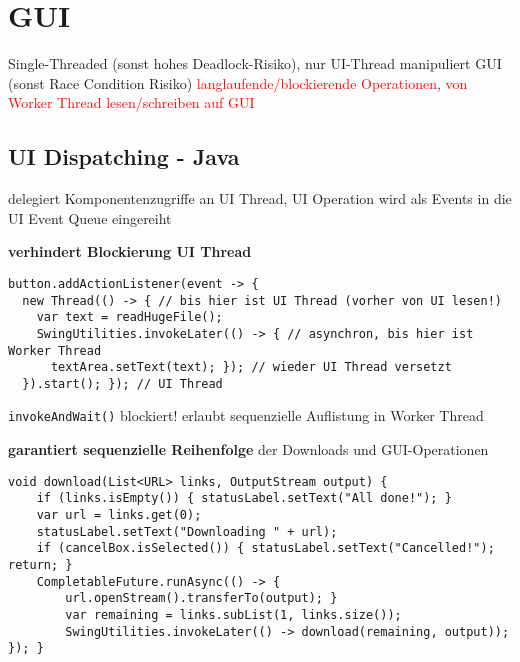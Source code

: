 \section{GUI}

Single-Threaded (sonst hohes Deadlock-Risiko), nur UI-Thread manipuliert GUI (sonst Race Condition Risiko) \textcolor{red}{langlaufende/blockierende Operationen}, \textcolor{red}{von Worker Thread lesen/schreiben auf GUI}

\subsection{UI Dispatching - Java}
delegiert Komponentenzugriffe an UI Thread, UI Operation wird als Events in die UI Event Queue eingereiht

\textbf{verhindert Blockierung UI Thread}
\begin{lstlisting}
button.addActionListener(event -> {
  new Thread(() -> { // bis hier ist UI Thread (vorher von UI lesen!)
    var text = readHugeFile();
    SwingUtilities.invokeLater(() -> { // asynchron, bis hier ist Worker Thread
      textArea.setText(text); }); // wieder UI Thread versetzt
  }).start(); }); // UI Thread
\end{lstlisting}

\lstinline{invokeAndWait()} blockiert! erlaubt sequenzielle Auflistung in Worker Thread

\textbf{garantiert sequenzielle Reihenfolge} der Downloads und GUI-Operationen
\begin{lstlisting}
void download(List<URL> links, OutputStream output) {
    if (links.isEmpty()) { statusLabel.setText("All done!"); }
    var url = links.get(0);
    statusLabel.setText("Downloading " + url);
    if (cancelBox.isSelected()) { statusLabel.setText("Cancelled!"); return; }
    CompletableFuture.runAsync(() -> {
        url.openStream().transferTo(output); }
        var remaining = links.subList(1, links.size());
        SwingUtilities.invokeLater(() -> download(remaining, output)); }); }
\end{lstlisting}

